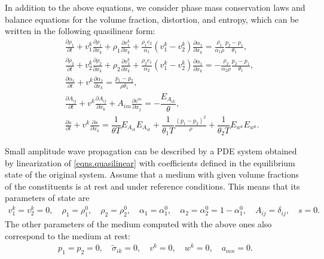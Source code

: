 \documentclass[3p,times,table]{article}
\begin{document}
In addition to the above equations, we consider phase mass conservation 
laws 
and balance equations for the volume fraction, distortion, and entropy, which can be 
written in the following quasilinear form:
\begin{subequations}\label{eqns.quasilinear}
	\begin{eqnarray} 
&&\frac{\partial \rho_1}{\partial t}+v^k_1\frac{\partial \rho_1}{\partial 
x_k}+\rho_1 \frac{\partial v^k_1}{\partial x_k}+
\frac{\rho_1c_2}{\alpha_1}(v^k_1-v^k_2)\frac{\partial \alpha_1}{\partial x_k}=
\frac{\rho_1}{\alpha_1 \rho} \frac{p_2-p_1}{\theta_1},   \\
&&\frac{\partial \rho_2}{\partial t}+v^k_2\frac{\partial \rho_2}{\partial 
x_k}+\rho_2 \frac{\partial v^k_2}{\partial x_k}+
\frac{\rho_2c_1}{\alpha_2}(v^k_1-v^k_2)\frac{\partial \alpha_1}{\partial x_k}=
-\frac{\rho_2}{\alpha_2 \rho} \frac{p_2-p_1}{\theta_1},   \\
&&\frac{\partial \alpha_1}{\partial t}+v^k\frac{\partial \alpha_1}{\partial 
x_k}=
\frac{p_1-p_2}{\rho \theta_1},  \\
&&\frac{\partial A_{i j}}{\partial t}+v^k \frac{\partial A_{ij}}{\partial x_k}
+A_{im}\frac{\partial v^m}{\partial x_j}
=-\dfrac{ E_{A_{ik}} }{\theta},  \\
&&\frac{\partial s}{\partial t}+v^k\frac{\partial s}{\partial x_k}=
\dfrac{1}{\theta T} E_{A_{ik}}E_{A_{ik}} +
\dfrac{1}{\theta_1 T}\frac{(p_1-p_2)^2}{\rho} +
\dfrac{1}{\theta_2 T} E_{w^k}E_{w^k}.  
\end{eqnarray}

\end{subequations}

Small amplitude wave propagation can be described by a PDE system obtained by 
linearization of \eqref{eqns.quasilinear} with coefficients defined in 
the equilibrium state of the original system. Assume that a medium with 
given volume fractions of the constituents is at rest and under reference 
conditions. This means that its parameters of state are
\begin{align}  \label{static.solution}
v_1^k=v_2^k=0, \quad \rho_1=\rho_1^0, \quad \rho_2=\rho_2^0, 
\quad \alpha_1=\alpha_1^0, \quad \alpha_2=\alpha_2^0 = 1-\alpha_1^0, \quad A_{ij}=\delta_{ij}, \quad s=0.  
\end{align}  
The other parameters of the medium computed with the above ones also correspond to the medium at rest:
\begin{align}
p_1=p_2=0, \quad \tilde \sigma_{ik}=0, \quad v^k=0, \quad w^k=0, \quad a_{mn}=0.
\end{align}
\end{document}
